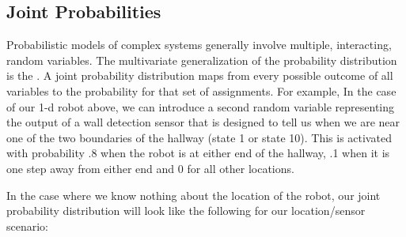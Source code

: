 






\subsection{Joint Probabilities}

Probabilistic models of complex systems generally involve multiple,
interacting, random variables.  The multivariate generalization of the
probability distribution is the .  A joint probability distribution maps from every
possible outcome of all variables to the probability for that set of
assignments.  For example, In the case of our 1-d robot above, we can
introduce a second random variable representing the output of a wall
detection sensor that is designed to tell us when we are near one of
the two boundaries of the hallway (state 1 or state 10). This is
activated with probability .8 when the robot is at either end of the
hallway, .1 when it is one step away from either end and 0 for all
other locations.

In the case where we know nothing about the location of the robot, our
joint probability distribution will look like the following for our
location/sensor scenario:

